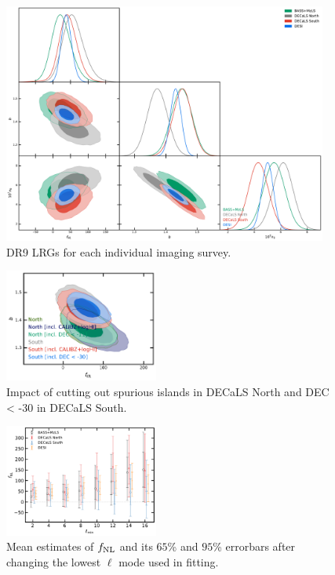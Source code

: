 \begin{figure}
    \centering
    \includegraphics[width=0.95\textwidth]{figures/mcmc_dr9regions.pdf} 
    \caption{DR9 LRGs for each individual imaging survey.}\label{fig:mcmc_dr9reg}
\end{figure}

\begin{figure}
    \centering
    \includegraphics[width=0.45\textwidth]{figures/mcmc_dr9_cutdec.pdf}     
    \caption{Impact of cutting out spurious islands in DECaLS North and DEC < -30 in DECaLS South.}\label{fig:mcmc_dr9cuts}
\end{figure}

\begin{figure}
    \centering
    \includegraphics[width=0.45\textwidth]{figures/fnl_elmin.pdf}     
    \caption{Mean estimates of $f_{\rm NL}$ and its $65$\% and $95$\% errorbars after changing the lowest $\ell$ mode used in fitting.}\label{fig:mcmc_dr9elmin}
\end{figure}
